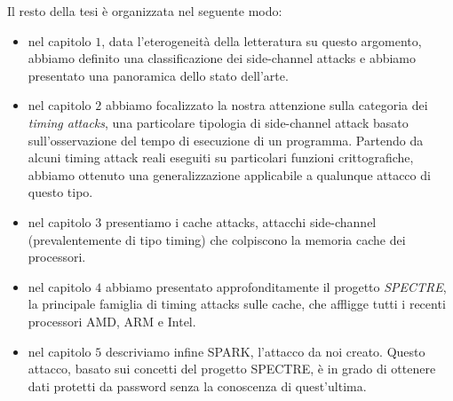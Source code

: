 	 Il resto della tesi è organizzata nel seguente modo:
	 \begin{itemize}
	 	\item nel capitolo $1$, data l'eterogeneità della letteratura su questo argomento, abbiamo definito una classificazione dei side-channel attacks e abbiamo presentato una panoramica dello stato dell'arte.
	 	\item nel capitolo $2$ abbiamo focalizzato la nostra attenzione sulla categoria dei \emph{timing attacks}, una particolare tipologia di side-channel attack basato sull'osservazione del tempo di esecuzione di un programma. Partendo da alcuni timing attack reali eseguiti su particolari funzioni crittografiche, abbiamo ottenuto una generalizzazione applicabile a qualunque attacco di questo tipo.
	 	\item nel capitolo $3$ presentiamo i cache attacks, attacchi side-channel (prevalentemente di tipo timing) che colpiscono la memoria cache dei processori.
	 	\item nel capitolo $4$ abbiamo presentato approfonditamente il progetto \emph{SPECTRE}, la principale famiglia di timing attacks sulle cache, che affligge tutti i recenti processori AMD, ARM e Intel.
	 	\item nel capitolo $5$ descriviamo infine \ac{SPARK}, l'attacco da noi creato. Questo attacco, basato sui concetti del progetto SPECTRE, è in grado di ottenere dati protetti da password senza la conoscenza di quest'ultima.
	 \end{itemize}    
